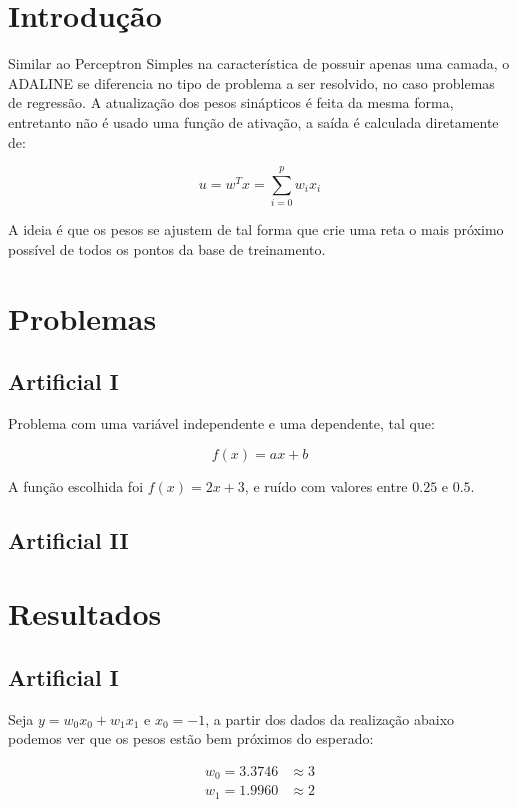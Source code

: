 \section{Introdução}\label{introduuxe7uxe3o}

Similar ao Perceptron Simples na característica de possuir apenas uma
camada, o ADALINE se diferencia no tipo de problema a ser resolvido, no
caso problemas de regressão. A atualização dos pesos sinápticos é feita
da mesma forma, entretanto não é usado uma função de ativação, a saída é
calculada diretamente de:

\[
u = w^T x = \sum^p_{i = 0} w_i x_i
\]

A ideia é que os pesos se ajustem de tal forma que crie uma reta o mais
próximo possível de todos os pontos da base de treinamento.

\section{Problemas}\label{problemas}

\subsection{Artificial I}\label{artificial-i}

Problema com uma variável independente e uma dependente, tal que:

\[f(x) = ax + b\]

A função escolhida foi \(f(x) = 2x + 3\), e ruído com valores entre
\(0.25\) e \(0.5\).

\subsection{Artificial II}\label{artificial-ii}

\section{Resultados}\label{resultados}

\subsection{Artificial I}\label{artificial-i-1}

Seja \(y = w_0 x_0 + w_1 x_1\) e \(x_0 = -1\), a partir dos dados da
realização abaixo podemos ver que os pesos estão bem próximos do
esperado:

\begin{align}
w_0 = 3.3746 &\approx 3 \\
w_1 = 1.9960 &\approx 2
\end{align}

